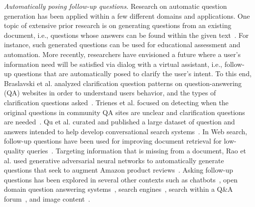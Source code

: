\noindent
{\em Automatically posing follow-up questions.} Research on automatic question generation has been applied within a few different domains and applications. One topic of extensive prior research is on generating questions from an existing document, i.e., questions whose answers can be found within the given text~\cite{vanderwende2008importance,rus2011question,zhou2017neural,heilman2010good,duan2017question,du2017learning}. For instance, such generated questions can be used for educational assessment and automation. More recently, researchers have envisioned a future where a user's information need will be satisfied via dialog with a virtual assistant, i.e., follow-up questions that are automatically posed to clarify the user's intent. To this end, Braslavski et al. analyzed clarification question patterns on question-answering (QA) websites in order to understand users behavior, and the types of clarification questions asked~\cite{10.1145/3020165.3022149}. Trienes et al. focused on detecting when the original questions in community QA sites are unclear and clarification questions are needed~\cite{trienes2019identifying}. Qu et al. curated and published a large dataset of question and answers intended to help develop conversational search systems~\cite{10.1145/3209978.3210124}. In Web search, follow-up questions have been used for improving document retrieval for low-quality queries~\cite{10.1145/3366423.3380126,10.1145/3331184.3331265,stoyanchev2014towards}. Targeting information that is missing from a document, Rao et al. used generative adversarial neural networks to automatically generate questions that seek to augment Amazon product reviews~\cite{rao2019answer}. Asking follow-up questions has been explored in several other contexts such as chatbots~\cite{Hancock2019LearningFD}, open domain question answering systems~\cite{de2005implementing, de2003analysis}, search engines~\cite{Ren2020ConversationsWS}, search within a Q\&A forum~\cite{zhang2020chatbot4qr}, and image content~\cite{Mostafazadeh_2016}.
